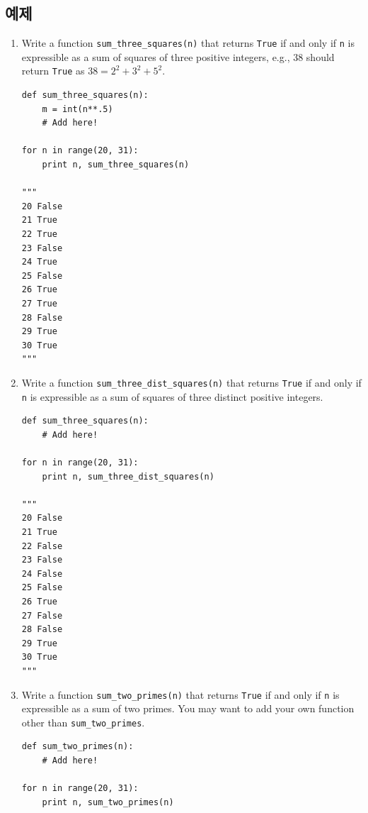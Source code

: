 \documentclass[../main.tex]{subfiles}
\begin{document}
\subsection{예제}
\begin{enumerate}
\item Write a function \texttt{sum\_three\_squares(n)} that returns \texttt{True} if and only if \texttt{n} is expressible as a sum of squares of three positive integers, e.g., 38 should return \texttt{True} as $38 = 2^2 + 3^2 + 5^2$.
\begin{verbatim}
def sum_three_squares(n):
    m = int(n**.5)
    # Add here!
    
for n in range(20, 31):
    print n, sum_three_squares(n)

"""
20 False
21 True
22 True
23 False
24 True
25 False
26 True
27 True
28 False
29 True
30 True
"""
\end{verbatim}

\item Write a function \texttt{sum\_three\_dist\_squares(n)} that returns \texttt{True} if and only if \texttt{n} is expressible as a sum of squares of three distinct positive integers.
\begin{verbatim}
def sum_three_squares(n):
    # Add here!
    
for n in range(20, 31):
    print n, sum_three_dist_squares(n)

"""
20 False
21 True
22 False
23 False
24 False
25 False
26 True
27 False
28 False
29 True
30 True
"""
\end{verbatim}

\item Write a function \texttt{sum\_two\_primes(n)} that returns \texttt{True} if and only if \texttt{n} is expressible as a sum of two primes.
You may want to add your own function other than \texttt{sum\_two\_primes}.
\begin{verbatim}
def sum_two_primes(n):
    # Add here!
    
for n in range(20, 31):
    print n, sum_two_primes(n)


\end{verbatim}
\end{enumerate}
\end{document}
